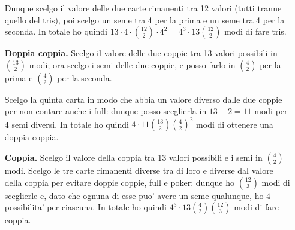 \begin{itemize}
    Dunque scelgo il valore delle due carte rimanenti tra 12 valori (tutti tranne quello del tris), poi scelgo un seme tra 4 per la prima e un seme tra 4 per la seconda. In totale ho quindi $13 \cdot 4 \cdot \binom{12}{2} \cdot 4^2 = 4^3 \cdot 13 \binom{12}{2}$ modi di fare tris.
    \item[\textbf{Doppia coppia.}] Scelgo il valore delle due coppie tra 13 valori possibili in $\binom{13}{2}$ modi; ora scelgo i semi delle due coppie, e posso farlo in $\binom{4}{2}$ per la prima e $\binom{4}{2}$ per la seconda. 
    
    Scelgo la quinta carta in modo che abbia un valore diverso dalle due coppie per non contare anche i full: dunque posso sceglierla in $13 - 2 = 11$ modi per 4 semi diversi. In totale ho quindi $4 \cdot 11\binom{13}{2}\binom{4}{2}^2$ modi di ottenere una doppia coppia.
    \item[\textbf{Coppia.}] Scelgo il valore della coppia tra 13 valori possibili e i semi in $\binom{4}{2}$ modi. Scelgo le tre carte rimanenti diverse tra di loro e diverse dal valore della coppia per evitare doppie coppie, full e poker: dunque ho $\binom{12}{3}$ modi di sceglierle e, dato che ognuna di esse puo' avere un seme qualunque, ho $4$ possibilita' per ciascuna. In totale ho quindi $4^3 \cdot 13 \binom{4}{2} \binom{12}{3}$ modi di fare coppia.
\end{itemize}